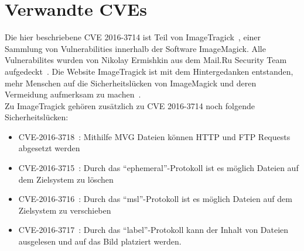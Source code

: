 \newpage
\section{Verwandte CVEs}\label{sec:verwandte-cves}

Die hier beschriebene CVE 2016-3714 ist Teil von ImageTragick~\cite{ImageTragick}, einer Sammlung von Vulnerabilities
innerhalb der Software ImageMagick.
Alle Vulnerabilites wurden von Nikolay Ermishkin aus dem Mail.Ru Security Team aufgedeckt~\cite{ImageTragick}.
Die Website ImageTragick ist mit dem Hintergedanken entstanden,
mehr Menschen auf die Sicherheitslücken von ImageMagick und deren Vermeidung aufmerksam zu machen~\cite{ImageTragick}.\\

Zu ImageTragick gehören zusätzlich zu CVE 2016-3714 noch folgende Sicherheitslücken:

\begin{itemize}[\itemsep=1em]
    \item CVE-2016-3718~\cite{CVE20163718HTTPFTP}: Mithilfe MVG Dateien können HTTP und FTP Requests abgesetzt werden
    \item CVE-2016-3715~\cite{CVE20163715EPHEMERALCoder}: Durch das "`ephemeral"'-Protokoll ist es möglich Dateien auf dem Zielsystem zu löschen
    \item CVE-2016-3716~\cite{CVE20163716MSLCoder}: Durch das "`msl"'-Protokoll ist es möglich Dateien auf dem Zielsystem zu verschieben
    \item CVE-2016-3717~\cite{CVE20163717LABELCoder}: Durch das "`label"'-Protokoll kann der Inhalt von Dateien ausgelesen und auf das Bild platziert werden.
\end{itemize}